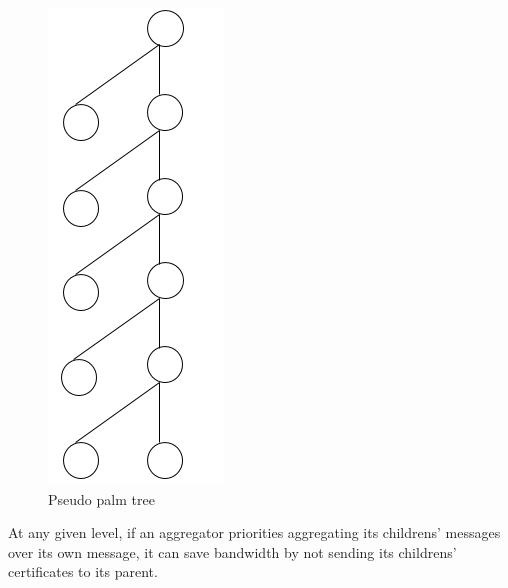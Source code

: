 	\begin{figure}[hp]
		\centering
		\includegraphics[scale = 0.3]{images/pseudo-palm-tree}
		\caption{Pseudo palm tree}
		\label{fig:pseudo}
	\end{figure}

	\begin{theorem}
		At any given level, if an aggregator priorities aggregating its childrens' messages over its own message, it can save bandwidth by not sending its childrens' certificates to its parent.
	\end{theorem}

